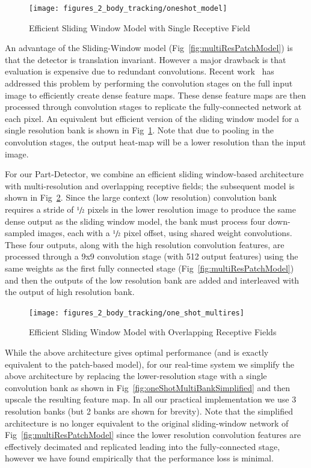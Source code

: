 \begin{figure}[th]
  \centering
    \texttt{[image: figures\_2\_body\_tracking/oneshot\_model]}
    \caption{Efficient Sliding Window Model with Single Receptive Field}
  \label{fig:oneShotOneBank}
\end{figure}

An advantage of the Sliding-Window model (Fig~\ref{fig:multiResPatchModel}) is that the detector is translation invariant. However a major drawback is that evaluation is expensive due to redundant convolutions. Recent work~\cite{fastcnn,overfeatSermanet} has addressed this problem by performing the convolution stages on the full input image to efficiently create dense feature maps. These dense feature maps are then processed through convolution stages to replicate the fully-connected network at each pixel. An equivalent but efficient version of the sliding window model for a single resolution bank is shown in Fig~\ref{fig:oneShotOneBank}. Note that due to pooling in the convolution stages, the output heat-map will be a lower resolution than the input image.

For our Part-Detector, we combine an efficient sliding window-based architecture with multi-resolution and overlapping receptive fields; the subsequent model is shown in Fig~\ref{fig:oneShotMultiBank}. Since the large context (low resolution) convolution bank requires a stride of $\sfrac{1}{2}$ pixels in the lower resolution image to produce the same dense  output as the sliding window model, the bank must process four down-sampled images, each with a $\sfrac{1}{2}$ pixel offset, using shared weight convolutions. These four outputs, along with the high resolution convolution features, are processed through a 9x9 convolution stage (with 512 output features) using the same weights as the first fully connected stage (Fig~\ref{fig:multiResPatchModel}) and then the outputs of the low resolution bank are added and interleaved with the output of high resolution bank.

\begin{figure}[th]
  \centering
    \texttt{[image: figures\_2\_body\_tracking/one\_shot\_multires]}
    \caption{Efficient Sliding Window Model with Overlapping Receptive Fields}
  \label{fig:oneShotMultiBank}
\end{figure}

While the above architecture gives optimal performance (and is exactly equivalent to the patch-based model), for our real-time system we simplify the above architecture by replacing the lower-resolution stage with a single convolution bank as shown in Fig~\ref{fig:oneShotMultiBankSimplified} and then upscale the resulting feature map. In all our practical implementation we use 3 resolution banks (but 2 banks are shown for brevity). Note that the simplified architecture is no longer equivalent to the original sliding-window network of Fig~\ref{fig:multiResPatchModel} since the lower resolution convolution features are effectively decimated and replicated leading into the fully-connected stage, however we have found empirically that the performance loss is minimal.

